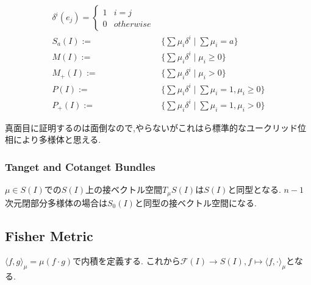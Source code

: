 \documentclass[dvipdfmx]{jarticle}
\begin{document}
\begin{align*}
\delta^i(e_j) = \left\{
\begin{array}{ll}
1 & i = j \\
0 & otherwise
\end{array}
\right. \\
S_a(I):= & \{\sum \mu_i \delta^i \mid \sum \mu_i = a\} \\
M(I):= & \{\sum \mu_i \delta^i \mid \mu_i \ge 0\} \\
M_{+}(I):= & \{\sum \mu_i \delta^i \mid \mu_i > 0\} \\
P(I):= & \{\sum \mu_i \delta^i \mid \sum \mu_i = 1, \mu_i \ge 0\} \\
P_{+}(I):= & \{\sum \mu_i \delta^i \mid \sum \mu_i = 1, \mu_i > 0\}
\end{align*}

真面目に証明するのは面倒なので,やらないがこれはら標準的なユークリッド位相により多様体と思える.

\subsubsection{Tanget and Cotanget Bundles}
$\mu \in S(I)$での$S(I)$上の接ベクトル空間$T_{\mu}S(I)$は$S(I)$と同型となる.
$n-1$次元閉部分多様体の場合は$S_0(I)$と同型の接ベクトル空間になる.

\subsection{Fisher Metric}
$\langle f, g \rangle_{\mu} = \mu(f \cdot g)$で内積を定義する.
これから$\mathcal{F}(I) \to S(I), f \mapsto \langle f, \cdot \rangle_{\mu}$となる.
\end{document}

